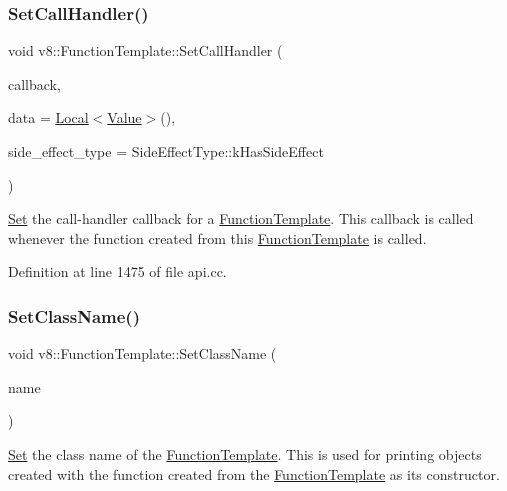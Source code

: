 \subsubsection{\texorpdfstring{Set\+Call\+Handler()}{SetCallHandler()}}
{\footnotesize\ttfamily void v8\+::\+Function\+Template\+::\+Set\+Call\+Handler (\begin{DoxyParamCaption}\item[{Function\+Callback}]{callback,  }\item[{\mbox{\hyperlink{classv8_1_1Local}{v8\+::\+Local}}$<$ \mbox{\hyperlink{classv8_1_1Value}{Value}} $>$}]{data = {\ttfamily \mbox{\hyperlink{classv8_1_1Local}{Local}}$<$\mbox{\hyperlink{classv8_1_1Value}{Value}}$>$()},  }\item[{\mbox{\hyperlink{namespacev8_a29711319c2b9fc7716d65faee2f7b9cb}{Side\+Effect\+Type}}}]{side\+\_\+effect\+\_\+type = {\ttfamily SideEffectType\+:\+:kHasSideEffect} }\end{DoxyParamCaption})}

\mbox{\hyperlink{classv8_1_1Set}{Set}} the call-\/handler callback for a \mbox{\hyperlink{classv8_1_1FunctionTemplate}{Function\+Template}}. This callback is called whenever the function created from this \mbox{\hyperlink{classv8_1_1FunctionTemplate}{Function\+Template}} is called. 

Definition at line 1475 of file api.\+cc.

\mbox{\label{classv8_1_1FunctionTemplate_a491e77dc7ceb5b0fe75880d11f2dbe9e}} 
\subsubsection{\texorpdfstring{Set\+Class\+Name()}{SetClassName()}}
{\footnotesize\ttfamily void v8\+::\+Function\+Template\+::\+Set\+Class\+Name (\begin{DoxyParamCaption}\item[{\mbox{\hyperlink{classv8_1_1Local}{Local}}$<$ \mbox{\hyperlink{classv8_1_1String}{String}} $>$}]{name }\end{DoxyParamCaption})}

\mbox{\hyperlink{classv8_1_1Set}{Set}} the class name of the \mbox{\hyperlink{classv8_1_1FunctionTemplate}{Function\+Template}}. This is used for printing objects created with the function created from the \mbox{\hyperlink{classv8_1_1FunctionTemplate}{Function\+Template}} as its constructor. 

